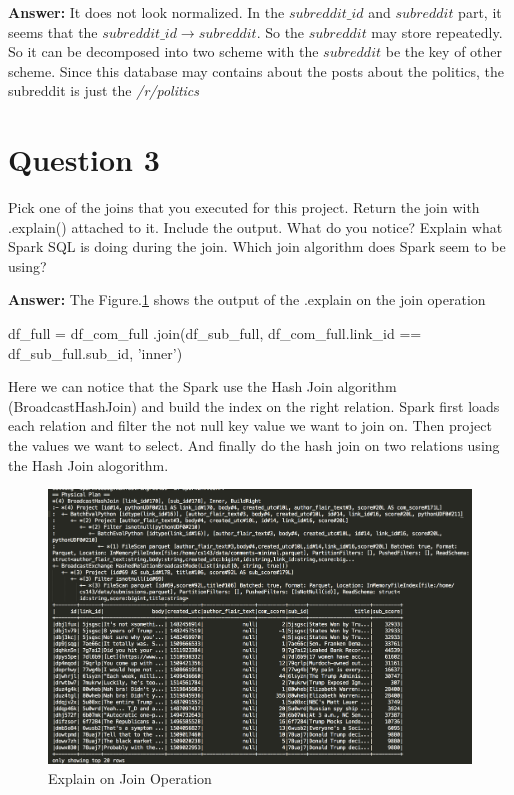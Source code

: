 \documentclass[12pt]{article}
\begin{document}
\textbf{Answer:} It does not look normalized. In the $subreddit\_id$ and $subreddit$ part, it seems that the  $subreddit\_id \to subreddit$. So the $subreddit$ may store repeatedly. So it can be decomposed into two scheme with the $subreddit$ be the key of other scheme. Since this database may contains about the posts about the politics, the subreddit is just the \textit{/r/politics}


\section {Question 3}
Pick one of the joins that you executed for this project. Return the join with .explain() attached to it. Include the output. What do you notice? Explain what Spark SQL is doing during the join. Which join algorithm does Spark seem to be using?

\textbf{Answer:} The Figure.\ref{fig:explain} shows the output of the .explain on the join operation 
\begin{python}
df_full = df_com_full
	.join(df_sub_full, 
	df_com_full.link_id == df_sub_full.sub_id, 
	'inner')
\end{python}

Here we can notice that the Spark use the Hash Join algorithm (BroadcastHashJoin) and build the index on the right relation.  Spark first loads each relation and filter the not null key value we want to join on. Then project the values we want to select. And finally do the hash join on two relations using the Hash Join alogorithm.

\begin{figure}[!h]
     \begin{center}
                  \includegraphics[width=1.12\textwidth]{explain.png}
    \end{center}
    \caption{%
       Explain on Join Operation
     }%
     \label {fig:explain}
 \end{figure}
 
\end{document}
